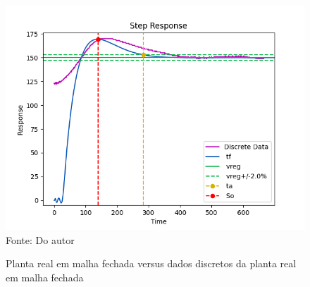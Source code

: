 \begin{figure}[H]
    \centering
    \caption{Planta real em malha fechada versus dados discretos da planta real em malha fechada}
    \includegraphics[scale=0.8]{figuras/real_planta_ctrl_vs_disc}
    \label{fig:real_planta_ctrl_vs_disc}
    \\
    \vspace{0cm}\hspace{0cm}\small{Fonte: Do autor}
\end{figure}